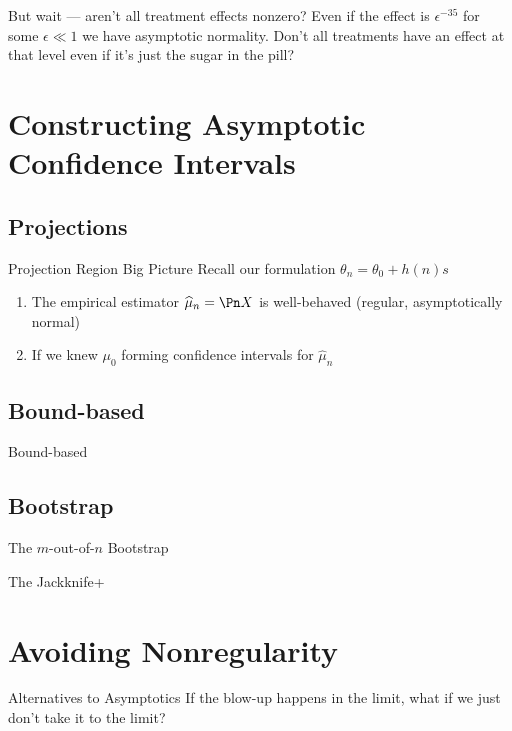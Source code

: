 \documentclass[aspectratio=169, professionalfonts]{beamer}
\begin{document}
\begin{frame}{But wait --- aren't all treatment effects nonzero?}
	Even if the effect is $\epsilon^{-35}$ for some $\epsilon \ll 1$ we have asymptotic
	normality. Don't all treatments have an  effect at that level even if it's
	just the sugar in the pill?
\end{frame}



\section{Constructing Asymptotic Confidence Intervals}
\subsection{Projections}
\begin{frame}{Projection Region Big Picture}
	Recall our formulation $\theta_n = \theta_0 + h(n)s$
	\begin{enumerate}
		\item The empirical estimator $\widehat{\mu}_n = \Pn X$ is well-behaved (regular, asymptotically normal)
		\item If we knew $\mu_0$ forming confidence intervals for $\widehat{\mu}_n$
	\end{enumerate}
\end{frame}
\subsection{Bound-based}
\begin{frame}{Bound-based}
\end{frame}
\subsection{Bootstrap}
\begin{frame}{The $m$-out-of-$n$ Bootstrap}
\end{frame}

\begin{frame}{The Jackknife+}
\end{frame}

\section{Avoiding Nonregularity}
\begin{frame}{Alternatives to Asymptotics}
	If the blow-up happens in the limit, what if we just don't take it to the limit?


\end{frame}
\end{document}

